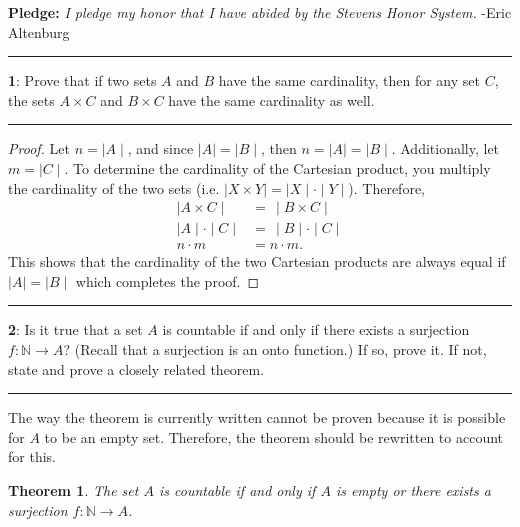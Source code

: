 \documentclass[11pt]{article}
\newtheorem{theorem}{Theorem}
\newcommand\question[2]{\vspace{.25in}\hrule\textbf{#1}: #2\vspace{.5em}\hrule\vspace{.10in}}
\newcommand{\N}{\mathbb{N}}
\begin{document}
\raggedright
\newcommand\NAME{Eric Altenburg}  %
\newcommand\COURSE{MA-240}
\newcommand\HWNUM{7}              %


\textbf{Pledge:} \textit{I pledge my honor that I have abided by the Stevens Honor System.} -Eric Altenburg

\question{1}{Prove that if two sets $A$ and $B$ have the same cardinality, then for any set $C$, the sets $A \times C$ and $B \times C$ have the same cardinality as well.}

\begin{proof}
	Let $n = \mid A \mid$, and since $\mid A \mid = \mid B \mid$, then $n = \mid A \mid = \mid B \mid$. Additionally, let $m = \mid C \mid$. To determine the cardinality of the Cartesian product, you multiply the cardinality of the two sets (i.e. $\mid X \times Y \mid = \mid X \mid \cdot \mid Y \mid$). Therefore, 
	\begin{align*}
		\mid A \times C \mid &= \,\mid B \times C \mid\\
		\mid A \mid \cdot \mid C \mid &= \,\mid B \mid \cdot \mid C \mid\\
		n \cdot m &= n \cdot m.
	\end{align*}
	This shows that the cardinality of the two Cartesian products are always equal if $\mid A \mid = \mid B \mid$ which completes the proof.
\end{proof}


\question{2}{Is it true that a set $A$ is countable if and only if there exists a surjection $f : \N \rightarrow A$? (Recall that a surjection is an onto function.) If so, prove it. If not, state and prove a closely related theorem.}

The way the theorem is currently written cannot be proven because it is possible for $A$ to be an empty set. Therefore, the theorem should be rewritten to account for this.

\begin{theorem}
	The set $A$ is countable if and only if $A$ is empty or there exists a surjection $f : \N \rightarrow A$.
\end{theorem}
\end{document}
